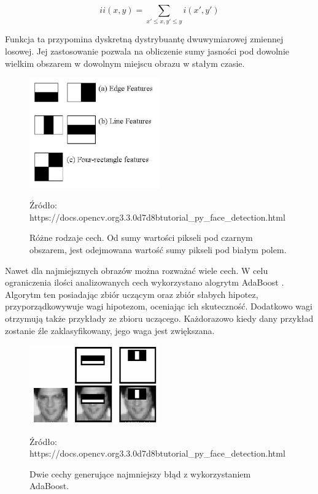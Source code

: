\documentclass[oneside, eng]{mgr}
\begin{document}
\begin{equation}
	ii(x,y) = \sum_{x' \leq x, y' \leq y} i(x',y')
\end{equation}

Funkcja ta przypomina dyskretną dystrybuantę dwuwymiarowej zmiennej losowej. Jej zastosowanie pozwala na obliczenie sumy jasności pod dowolnie wielkim obszarem w dowolnym miejscu obrazu w stałym czasie.

\begin{figure}
\centering
	\includegraphics[width=0.50\textwidth,natwidth=610,natheight=642]{haar_features.jpg}\par\vspace{0.5cm}
\caption{Różne rodzaje cech. Od sumy wartości pikseli pod czarnym obszarem, jest odejmowana wartość sumy pikseli pod białym polem.}
Źródło: https://docs.opencv.org\/3.3.0\/d7\/d8b\/tutorial\_py\_face\_detection.html
	\label{fig:features}
\end{figure}

Nawet dla najmiejsznych obrazów można rozważać wiele cech. W celu ograniczenia ilości analizowanych cech wykorzystano alogrytm AdaBoost \cite{AdaBoost}. Algorytm ten posiadając zbiór uczącym oraz zbiór słabych hipotez, przyporządkowywuje wagi hipotezom, oceniając ich skuteczność. Dodatkowo wagi otrzymują także przykłady ze zbioru uczącego. Każdorazowo kiedy dany przykład zostanie źle zaklasyfikowany, jego waga jest zwiększana. 


\begin{figure}
\centering
	\includegraphics[width=0.50\textwidth,natwidth=610,natheight=642]{haar.png}\par\vspace{1cm}
\caption{Dwie cechy generujące najmniejszy błąd z wykorzystaniem AdaBoost.}
Źródło: https://docs.opencv.org\/3.3.0\/d7\/d8b\/tutorial\_py\_face\_detection.html
	\label{fig:best_features}
\end{figure}
\end{document}
